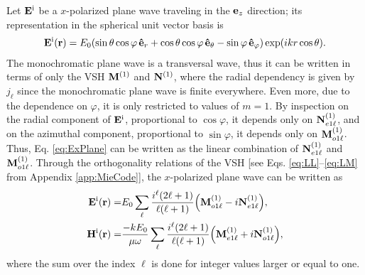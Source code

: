 
 Let $\vb{E}^{\text{i}}$ be a $x$-polarized plane wave traveling in the  $\vb{e}_z$ direction; its representation in the spherical unit vector basis is
 \begin{align}
 \vb{E}^{\text{i}} (\vb{r})= E_0\qty(\sin\theta\cos\varphi \, \vu{e}_r +
					\cos\theta\cos\varphi \,\vu{e}_\theta
					- \sin\varphi \,\vu{e}_\varphi) \exp(ikr\cos\theta).
	\label{eq:ExPlane}
 \end{align}
The monochromatic plane wave is a transversal wave, thus it can be written in terms of only the VSH $\vb{M}^{(1)}$ and $\vb{N}^{(1)}$, where the radial dependency is given by $j_\ell$ since the monochromatic plane wave is finite everywhere. Even more, due to the dependence on $\varphi$, it is only restricted to values of $m = 1$. By inspection on the radial component of $\vb{E}^\text{i}$, proportional to $\cos\varphi$, it depends only on $\vb{N}_{e1\ell}^{(1)}$, and on the azimuthal component, proportional to $\sin\varphi$, it depends only on $\vb{M}_{o1\ell}^{(1)}$. Thus, Eq. \eqref{eq:ExPlane} can be written as the linear combination of  $\vb{N}_{e1\ell}^{(1)}$ and $\vb{M}_{o1\ell}^{(1)}$. Through the orthogonality relations of the VSH [see Eqs. \eqref{eq:LL}--\eqref{eq:LM} from Appendix \ref{app:MieCode}], the $x$-polarized plane wave can be written as \cite{stratton_electromagnetic_2012}
%
%
%
%
  \begin{subequations}
 \begin{align}
 \vb{E}^\text{i} (\vb{r})=& E_0 \sum_\ell\frac{i^\ell(2\ell+1)}{\ell(\ell+1)}\qty( \vb{M}_{o1\ell}^{(1)} -i \vb{N}_{e1\ell}^{(1)}),
\\
 \vb{H}^\text{i} (\vb{r})=& \frac{-kE_0}{\mu\omega} \sum_\ell\frac{i^\ell(2\ell+1)}{\ell(\ell+1)}\qty( \vb{M}_{e1\ell}^{(1)} +i \vb{N}_{o1\ell}^{(1)}),
 \end{align}%
 \label{eq:plane waveMultipole}%
   \end{subequations}%
%
where the sum over the index $\ell$ is done for integer values larger or equal to one.

